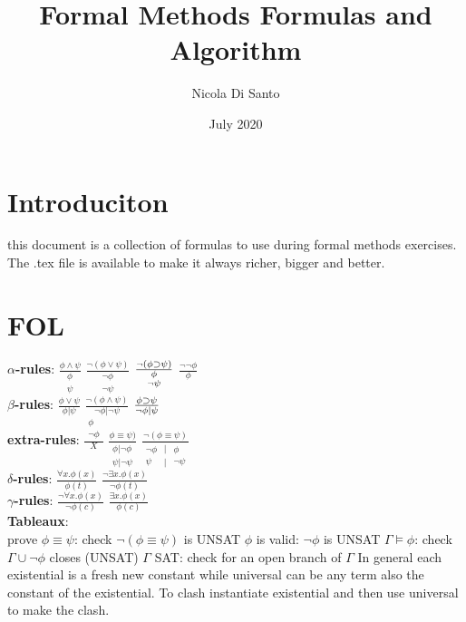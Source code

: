 \documentclass{article}
\title{Formal Methods Formulas and Algorithm}
\author{Nicola Di Santo }
\date{July 2020}
\DeclareRobustCommand{\impl}{\text{\reflectbox{$\subset$}}}
\begin{document}
\maketitle
\section{Introduciton}
this document is a collection of formulas to use during formal methods exercises. The .tex file is available to make it always richer, bigger and better. 

\twocolumn

\section{FOL}
\textbf{$\alpha$-rules}:\newline
$\frac{\phi \wedge \psi}{\substack{\phi\\\psi}} $ 
$\frac{\neg(\phi \vee \psi)}{\substack{\neg\phi\\\neg\psi}} $ 
$\frac{\neg(\phi \impl \psi)}{\substack{\phi\\\neg\psi}} $
$\frac{\neg\neg\phi}{\phi} $ \\

\textbf{$\beta$-rules}:\newline
$\frac{\phi \vee \psi}{\phi|\psi} $ 
$\frac{\neg(\phi \wedge \psi)}{\neg\phi|\neg\psi} $ 
$\frac{\phi \impl \psi}{\neg\phi|\psi} $ \\

\textbf{extra-rules}:\newline
$\frac{\substack{\phi\\\neg\phi}}{X} $ 
$\frac{\phi \equiv \psi)}{\substack{\phi|\neg\phi\\\psi|\neg\psi}} $ 
$\frac{\neg(\phi \equiv \psi)}{\substack{\neg\phi\\\psi}\substack{|\\|} \substack{\phi\\\neg\psi}} $ \\

\textbf{$\delta$-rules}:\newline
$\frac{\forall x.\phi(x) }{\phi(t)} $ 
$\frac{\neg\exists x.\phi(x) }{\neg\phi(t)} $\\

\textbf{$\gamma$-rules}:\newline
$\frac{\neg\forall x.\phi(x) }{\neg\phi(c)} $ 
$\frac{\exists x.\phi(x) }{\phi(c)} $\\

\textbf{Tableaux}: \\
prove $\phi\equiv\psi$: check $\neg(\phi\equiv\psi)$ is UNSAT\newline
$\phi$ is valid: $\neg\phi$ is UNSAT\newline
$\Gamma\models\phi$: check $\Gamma\cup\neg\phi$ closes (UNSAT)\newline
$\Gamma$ SAT: check for an open branch of $\Gamma$\newline
In general each existential is a fresh new constant while universal can be any term also the constant of the existential. To clash instantiate existential and then use universal to make the clash.
\end{document}
